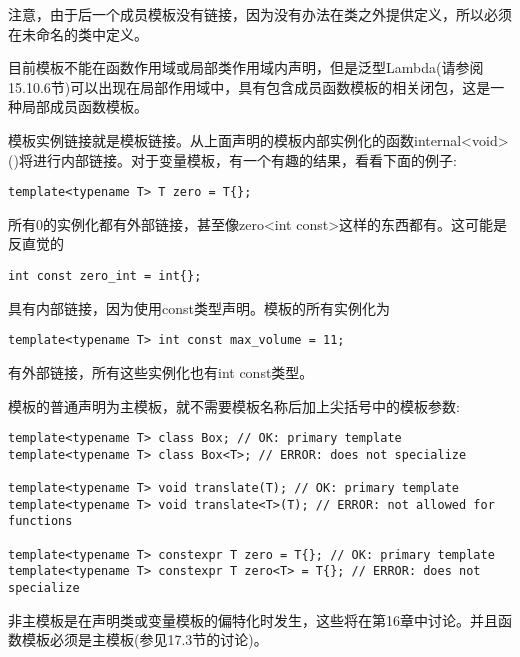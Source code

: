 注意，由于后一个成员模板没有链接，因为没有办法在类之外提供定义，所以必须在未命名的类中定义。

目前模板不能在函数作用域或局部类作用域内声明，但是泛型Lambda(请参阅15.10.6节)可以出现在局部作用域中，具有包含成员函数模板的相关闭包，这是一种局部成员函数模板。

模板实例链接就是模板链接。从上面声明的模板内部实例化的函数internal<void>()将进行内部链接。对于变量模板，有一个有趣的结果，看看下面的例子:

\begin{lstlisting}[style=styleCXX]
template<typename T> T zero = T{};
\end{lstlisting}

所有0的实例化都有外部链接，甚至像zero<int const>这样的东西都有。这可能是反直觉的

\begin{lstlisting}[style=styleCXX]
int const zero_int = int{};
\end{lstlisting}

具有内部链接，因为使用const类型声明。模板的所有实例化为

\begin{lstlisting}[style=styleCXX]
template<typename T> int const max_volume = 11;
\end{lstlisting}

有外部链接，所有这些实例化也有int const类型。


模板的普通声明为主模板，就不需要模板名称后加上尖括号中的模板参数:

\begin{lstlisting}[style=styleCXX]
template<typename T> class Box; // OK: primary template
template<typename T> class Box<T>; // ERROR: does not specialize

template<typename T> void translate(T); // OK: primary template
template<typename T> void translate<T>(T); // ERROR: not allowed for functions

template<typename T> constexpr T zero = T{}; // OK: primary template
template<typename T> constexpr T zero<T> = T{}; // ERROR: does not specialize
\end{lstlisting}

非主模板是在声明类或变量模板的偏特化时发生，这些将在第16章中讨论。并且函数模板必须是主模板(参见17.3节的讨论)。


















